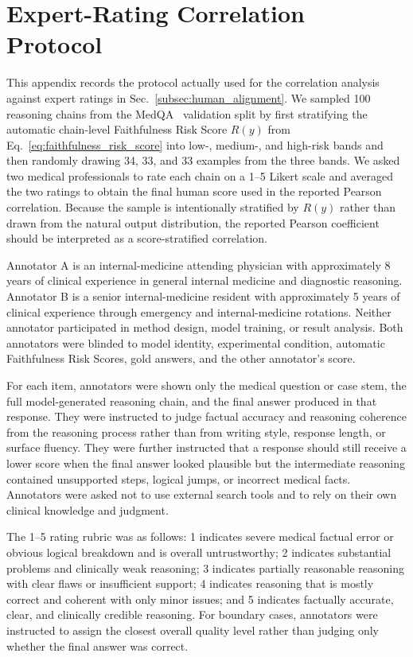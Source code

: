 \documentclass[a4paper,fleqn,doubleblind]{cas-sc}
\begin{document}
\section{Expert-Rating Correlation Protocol}
\label{app:human_alignment_protocol}

This appendix records the protocol actually used for the correlation analysis against expert ratings in Sec.~\ref{subsec:human_alignment}. We sampled 100 reasoning chains from the MedQA~\cite{jin2021disease} validation split by first stratifying the automatic chain-level Faithfulness Risk Score $R(y)$ from Eq.~\ref{eq:faithfulness_risk_score} into low-, medium-, and high-risk bands and then randomly drawing 34, 33, and 33 examples from the three bands. We asked two medical professionals to rate each chain on a 1--5 Likert scale and averaged the two ratings to obtain the final human score used in the reported Pearson correlation. Because the sample is intentionally stratified by $R(y)$ rather than drawn from the natural output distribution, the reported Pearson coefficient should be interpreted as a score-stratified correlation.

Annotator A is an internal-medicine attending physician with approximately 8 years of clinical experience in general internal medicine and diagnostic reasoning. Annotator B is a senior internal-medicine resident with approximately 5 years of clinical experience through emergency and internal-medicine rotations. Neither annotator participated in method design, model training, or result analysis. Both annotators were blinded to model identity, experimental condition, automatic Faithfulness Risk Scores, gold answers, and the other annotator's score.

For each item, annotators were shown only the medical question or case stem, the full model-generated reasoning chain, and the final answer produced in that response. They were instructed to judge factual accuracy and reasoning coherence from the reasoning process rather than from writing style, response length, or surface fluency. They were further instructed that a response should still receive a lower score when the final answer looked plausible but the intermediate reasoning contained unsupported steps, logical jumps, or incorrect medical facts. Annotators were asked not to use external search tools and to rely on their own clinical knowledge and judgment.

The 1--5 rating rubric was as follows: 1 indicates severe medical factual error or obvious logical breakdown and is overall untrustworthy; 2 indicates substantial problems and clinically weak reasoning; 3 indicates partially reasonable reasoning with clear flaws or insufficient support; 4 indicates reasoning that is mostly correct and coherent with only minor issues; and 5 indicates factually accurate, clear, and clinically credible reasoning. For boundary cases, annotators were instructed to assign the closest overall quality level rather than judging only whether the final answer was correct.
\end{document}
